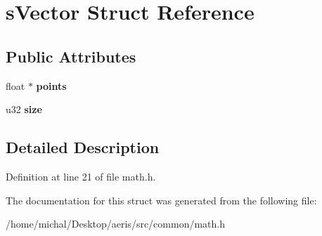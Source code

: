 \hypertarget{structsVector}{\section{s\-Vector Struct Reference}
\label{structsVector}
}
\subsection*{Public Attributes}
\begin{DoxyCompactItemize}
\item 
\hypertarget{structsVector_a4709eee0b2ac996456a703e2110afa99}{float $\ast$ {\bfseries points}}\label{structsVector_a4709eee0b2ac996456a703e2110afa99}

\item 
\hypertarget{structsVector_adc9ef8c0eed8f015533a62f9ff542381}{u32 {\bfseries size}}\label{structsVector_adc9ef8c0eed8f015533a62f9ff542381}

\end{DoxyCompactItemize}


\subsection{Detailed Description}


Definition at line 21 of file math.\-h.



The documentation for this struct was generated from the following file\-:\begin{DoxyCompactItemize}
\item 
/home/michal/\-Desktop/aeris/src/common/math.\-h\end{DoxyCompactItemize}
